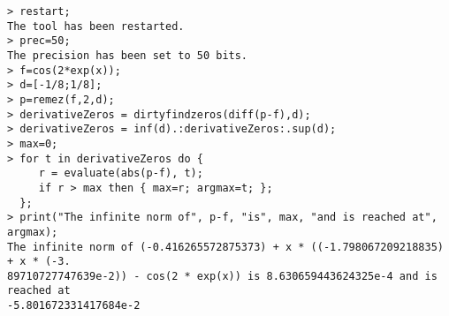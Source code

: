 \begin{center}\begin{minipage}{15cm}\begin{Verbatim}[frame=single]
> restart;
The tool has been restarted.
> prec=50;
The precision has been set to 50 bits.
> f=cos(2*exp(x));
> d=[-1/8;1/8];
> p=remez(f,2,d);
> derivativeZeros = dirtyfindzeros(diff(p-f),d);
> derivativeZeros = inf(d).:derivativeZeros:.sup(d);
> max=0;
> for t in derivativeZeros do {
     r = evaluate(abs(p-f), t);
     if r > max then { max=r; argmax=t; };
  };
> print("The infinite norm of", p-f, "is", max, "and is reached at", argmax);
The infinite norm of (-0.416265572875373) + x * ((-1.798067209218835) + x * (-3.
89710727747639e-2)) - cos(2 * exp(x)) is 8.630659443624325e-4 and is reached at 
-5.801672331417684e-2
\end{Verbatim}
\end{minipage}\end{center}
